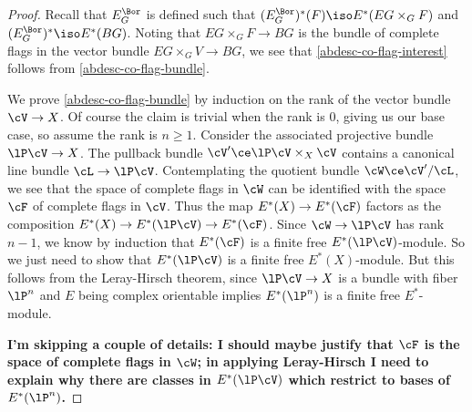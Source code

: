 \begin{proof}
  Recall that $E^\Bor_G$ is defined such that
  $(E^\Bor_G)^*(F) \iso E^*(EG \times_G F)$ and
  $(E^\Bor_G)^* \iso E^*(BG)$. Noting that $EG \times_G F \to BG$ is
  the bundle of complete flags in the vector bundle
  $EG \times_G V \to BG$, we see that \cref{abdesc-co-flag-interest}
  follows from \cref{abdesc-co-flag-bundle}.

  We prove \cref{abdesc-co-flag-bundle} by induction on the rank of
  the vector bundle $\cV \to X$. Of course the claim is trivial when
  the rank is $0$, giving us our base case, so assume the rank is
  $n \ge 1$. Consider the associated projective bundle $\lP\cV \to X$.
  The pullback bundle $\cV' \ce \lP\cV \times_X \cV$ contains a
  canonical line bundle $\cL \to \lP\cV$. Contemplating the quotient
  bundle $\cW \ce \cV'/\cL$, we see that the space of complete flags
  in $\cW$ can be identified with the space $\cF$ of complete flags in
  $\cV$. Thus the map $E^*(X) \to E^*(\cF)$ factors as the composition
  $E^*(X) \to E^*(\lP\cV) \to E^*(\cF)$. Since $\cW \to \lP\cV$ has
  rank $n-1$, we know by induction that $E^*(\cF)$ is a finite free
  $E^*(\lP\cV)$-module. So we just need to show that $E^*(\lP\cV)$ is
  a finite free $E^*(X)$-module. But this follows from the
  Leray-Hirsch theorem, since $\lP\cV \to X$ is a bundle with fiber
  $\lP^n$ and $E$ being complex orientable implies $E^*(\lP^n)$ is a
  finite free $E^*$-module.

  \textbf{I'm skipping a couple of details: I should maybe justify
    that $\cF$ is the space of complete flags in $\cW$; in applying
    Leray-Hirsch I need to explain why there are classes in
    $E^*(\lP\cV)$ which restrict to bases of $E^*(\lP^n)$.}
\end{proof}